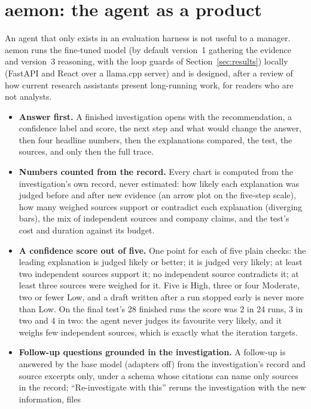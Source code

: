 \section{aemon: the agent as a product}\label{sec:app}
An agent that only exists in an evaluation harness is not useful to a manager. aemon runs the fine-tuned model (by default version~1 gathering the evidence and version~3 reasoning, with the
loop guards of Section~\ref{sec:results})
locally (FastAPI and React over a llama.cpp server) and is designed, after a review of how current research assistants
present long-running work, for readers who are not analysts.

\begin{itemize}
  \item \textbf{Answer first.} A finished investigation opens with the recommendation, a confidence label and score,
        the next step and what would change the answer, then four headline numbers, then the explanations compared,
        the test, the sources, and only then the full trace.
  \item \textbf{Numbers counted from the record.} Every chart is computed from the investigation's own record, never
        estimated: how likely each explanation was judged before and after new evidence (an arrow plot on the five-step
        scale), how many weighed sources support or contradict each explanation (diverging bars), the mix of
        independent sources and company claims, and the test's cost and duration against its budget.
  \item \textbf{A confidence score out of five.} One point for each of five plain checks: the leading explanation is
        judged likely or better; it is judged very likely; at least two independent sources support it; no independent
        source contradicts it; at least three sources were weighed for it. Five is High, three or four Moderate, two or
        fewer Low, and a draft written after a run stopped early is never more than Low. On the final test's 28 finished
        runs the score was 2 in 24 runs, 3 in two and 4 in two: the agent never judges its favourite very likely, and it
        weighs few independent sources, which is exactly what the iteration targets.
  \item \textbf{Follow-up questions grounded in the investigation.} A follow-up is answered by the base model (adapters
        off) from the investigation's record and source excerpts only, under a schema whose citations can name only
        sources in the record; ``Re-investigate with this'' reruns the investigation with the new information, files

\end{itemize}
